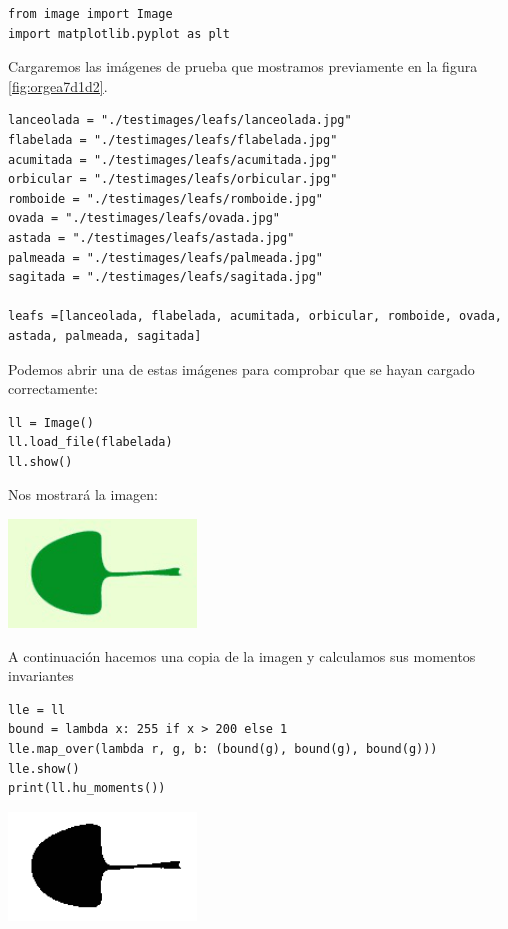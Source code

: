 \documentclass[letter]{article}
\begin{document}
\begin{verbatim}
from image import Image
import matplotlib.pyplot as plt
\end{verbatim}

Cargaremos las imágenes de prueba que mostramos previamente en la figura
\ref{fig:orgea7d1d2}.

\begin{verbatim}
lanceolada = "./testimages/leafs/lanceolada.jpg"
flabelada = "./testimages/leafs/flabelada.jpg"
acumitada = "./testimages/leafs/acumitada.jpg"
orbicular = "./testimages/leafs/orbicular.jpg"
romboide = "./testimages/leafs/romboide.jpg"
ovada = "./testimages/leafs/ovada.jpg"
astada = "./testimages/leafs/astada.jpg"
palmeada = "./testimages/leafs/palmeada.jpg"
sagitada = "./testimages/leafs/sagitada.jpg"

leafs =[lanceolada, flabelada, acumitada, orbicular, romboide, ovada, astada, palmeada, sagitada]
\end{verbatim}

Podemos abrir una de estas imágenes para comprobar que se hayan cargado correctamente:

\begin{verbatim}
ll = Image()
ll.load_file(flabelada)
ll.show()
\end{verbatim}

Nos mostrará la imagen:

\begin{center}
\includegraphics[width=5cm]{./images/show.png}
\end{center}

A continuación hacemos una copia de la imagen y calculamos sus momentos invariantes

\begin{verbatim}
lle = ll
bound = lambda x: 255 if x > 200 else 1
lle.map_over(lambda r, g, b: (bound(g), bound(g), bound(g)))
lle.show()
print(ll.hu_moments())
\end{verbatim}

\begin{center}
\includegraphics[width=5cm]{./images/showbn.png}
\end{center}
\end{document}
